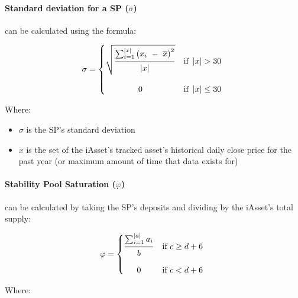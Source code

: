 \documentclass{article}
\begin{document}
\begin{sloppypar}
\hypertarget{standard-deviation-for-a-sp-sigma}{%
\paragraph{\texorpdfstring{Standard deviation for a SP
(\(\sigma\))}{Standard deviation for a SP (\textbackslash sigma)}}\label{standard-deviation-for-a-sp-sigma}}

can be calculated using the formula:

\[\sigma = \left\{ \begin{matrix}
  \sqrt{\genfrac{}{}{}{}{\raisebox{5pt}{$\sum_{i = 1}^{\left| x \right|}\left( x_{i}\  - \ \overline{x} \right)^{2}$}}{\raisebox{-5pt}{$\left| x \right|$}}} & \text{if\ }\left| x \right| > 30 \\ \\
  0 & \text{if\ }\left| x \right| \leq 30 \\
  \end{matrix} \right.\ \]

Where:

\begin{itemize}
\item
  \(\sigma\) is the SP's standard deviation
\item
  \(x\) is the set of the iAsset's tracked asset's historical daily
  close price for the past year (or maximum amount of time that data
  exists for)
\end{itemize}

\filbreak

\hypertarget{stability-pool-saturation-varphi}{%
\paragraph{\texorpdfstring{Stability Pool Saturation
(\(\varphi\))}{Stability Pool Saturation (\textbackslash varphi)}}\label{stability-pool-saturation-varphi}}

can be calculated by taking the SP's deposits and dividing by the
iAsset's total supply:

\[\varphi = \left\{ \begin{matrix}
  \genfrac{}{}{}{}{\raisebox{5pt}{$\sum_{i = 1}^{\left| a \right|}a_{i}$}}{\raisebox{-5pt}{$b$}} & \text{if\ }c \geq d + 6 \\ \\
  0 & \text{if\ }c < d + 6 \\
  \end{matrix} \right.\ \]

Where:


\end{sloppypar}
\end{document}
